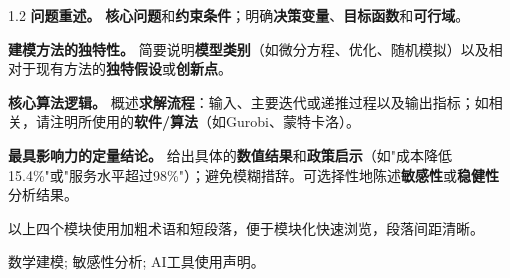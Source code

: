 \begin{spacing}{1.2}
\textbf{问题重述。} \textbf{核心问题}和\textbf{约束条件}；明确\textbf{决策变量}、\textbf{目标函数}和\textbf{可行域}。

\textbf{建模方法的独特性。} 简要说明\textbf{模型类别}（如微分方程、优化、随机模拟）以及相对于现有方法的\textbf{独特假设}或\textbf{创新点}。

\textbf{核心算法逻辑。} 概述\textbf{求解流程}：输入、主要迭代或递推过程以及输出指标；如相关，请注明所使用的\textbf{软件/算法}（如Gurobi、蒙特卡洛）。

\textbf{最具影响力的定量结论。} 给出具体的\textbf{数值结果}和\textbf{政策启示}（如"成本降低15.4\%"或"服务水平超过98\%"）；避免模糊措辞。可选择性地陈述\textbf{敏感性}或\textbf{稳健性}分析结果。

\vspace{0.5em}
以上四个模块使用加粗术语和短段落，便于模块化快速浏览，段落间距清晰。
\end{spacing}

\begin{keywords}
数学建模; 敏感性分析; AI工具使用声明。
\end{keywords}
